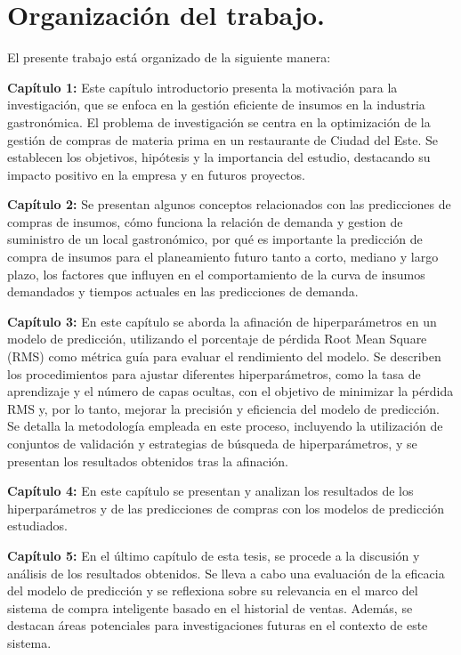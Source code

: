 \section{Organización del trabajo.} 
El presente trabajo está organizado de la siguiente manera:

\vspace{1\baselineskip}
\textbf{Capítulo 1:} 
Este capítulo introductorio presenta la motivación para la investigación, que se enfoca en la gestión eficiente de insumos en la industria gastronómica. El problema de investigación se centra en la optimización de la gestión de compras de materia prima en un restaurante de Ciudad del Este. Se establecen los objetivos, hipótesis y la importancia del estudio, destacando su impacto positivo en la empresa y en futuros proyectos.

\vspace{1\baselineskip}
\textbf{Capítulo 2:} 
Se presentan algunos conceptos relacionados con las predicciones de compras de insumos, cómo funciona la relación de demanda y gestion de suministro de un local gastronómico, por qué es importante la predicción de compra de insumos para el planeamiento futuro tanto a corto, mediano y largo plazo, los factores que influyen en el comportamiento de la curva de insumos demandados y tiempos actuales en las predicciones de demanda. 

\vspace{1\baselineskip}
\textbf{Capítulo 3:} 
En este capítulo se aborda la afinación de hiperparámetros en un modelo de predicción, utilizando el porcentaje de pérdida Root Mean Square (RMS) como métrica guía para evaluar el rendimiento del modelo. Se describen los procedimientos para ajustar diferentes hiperparámetros, como la tasa de aprendizaje y el número de capas ocultas, con el objetivo de minimizar la pérdida RMS y, por lo tanto, mejorar la precisión y eficiencia del modelo de predicción. Se detalla la metodología empleada en este proceso, incluyendo la utilización de conjuntos de validación y estrategias de búsqueda de hiperparámetros, y se presentan los resultados obtenidos tras la afinación.

\vspace{1\baselineskip}
\textbf{Capítulo 4:}
En este capítulo se presentan y analizan los resultados de los hiperparámetros y de las predicciones de compras con los modelos de  predicción estudiados. 

\vspace{1\baselineskip}
\textbf{Capítulo 5:}
En el último capítulo de esta tesis, se procede a la discusión y análisis de los resultados obtenidos. Se lleva a cabo una evaluación de la eficacia del modelo de predicción y se reflexiona sobre su relevancia en el marco del sistema de compra inteligente basado en el historial de ventas. Además, se destacan áreas potenciales para investigaciones futuras en el contexto de este sistema.
